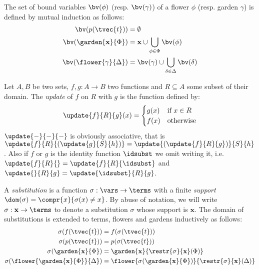 \begin{definition}[Bound variables]
  The set of bound variables $\bv(\phi)$ (resp. $\bv(\gamma)$) of a
  flower $\phi$ (resp. garden $\gamma$) is defined by mutual induction as
  follows:
  \begin{align*}
    \bv(p(\tvec{t})) &= \emptyset \\
    \bv(\garden{\mathbf{x}}{\Phi}) &= \mathbf{x} \cup \bigcup_{\phi \in \Phi}{\bv(\phi)} \\
    \bv(\flower{\gamma}{\Delta}) &= \bv(\gamma) \cup \bigcup_{\delta \in \Delta}{\bv(\delta)}
  \end{align*}
\end{definition}

\begin{definition}
  Let $A, B$ be two sets, $f, g : A \to B$ two functions and $R \subseteq A$
  some subset of their domain. The \emph{update} of $f$ on $R$ with $g$ is the
  function defined by:
  $$
  \update{f}{R}{g}(x) =
  \begin{cases}
    g(x) &\text{if $x \in R$} \\
    f(x) &\text{otherwise}
  \end{cases}
  $$
  $\update{-}{-}{-}$ is obviously associative, that is
  $\update{f}{R}{(\update{g}{S}{h})} = \update{(\update{f}{R}{g})}{S}{h}$. Also
  if $f$ or $g$ is the identity function $\idsubst$ we omit writing it, i.e.
  $\update{f}{R}{} = \update{f}{R}{\idsubst}$ and $\update{}{R}{g} =
  \update{\idsubst}{R}{g}$.
\end{definition}

\begin{definition}[Substitution]
  A \emph{substitution} is a function $\sigma : \vars \to \terms$ with a finite
  \emph{support} $\dom(\sigma) = \compr{x}{\sigma(x) \not= x}$. By abuse of
  notation, we will write $\sigma : \mathbf{x} \to \terms$ to denote a
  substitution $\sigma$ whose support is $\mathbf{x}$.
  The domain of substitutions is extended to terms, flowers and gardens
  inductively as follows:
  \begin{align*}
    \sigma(f(\tvec{t})) &= f(\sigma(\tvec{t})) \\
    \sigma(p(\tvec{t})) &= p(\sigma(\tvec{t})) \\
    \sigma(\garden{\mathbf{x}}{\Phi}) &=
      \garden{\mathbf{x}}{\restr{\sigma}{\mathbf{x}}(\Phi)} \\
    \sigma(\flower{\garden{\mathbf{x}}{\Phi}}{\Delta}) &=
      \flower{\sigma(\garden{\mathbf{x}}{\Phi})}{\restr{\sigma}{\mathbf{x}}(\Delta)}
  \end{align*}
\end{definition}



